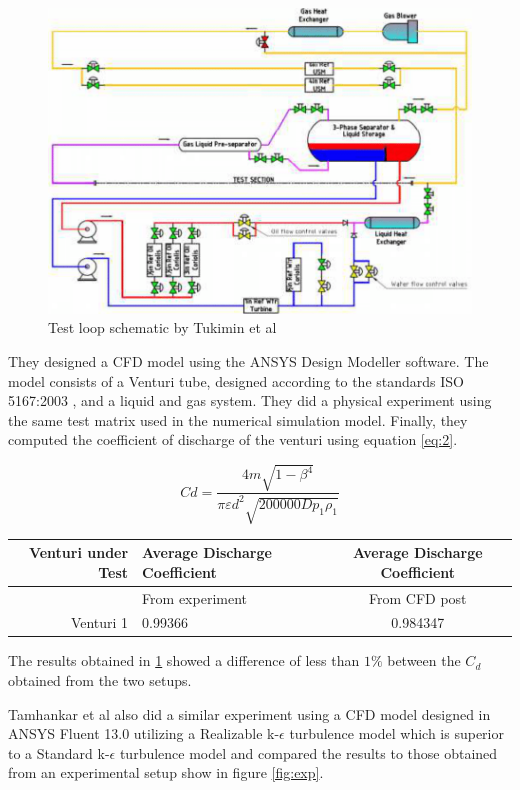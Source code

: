 \begin{figure}[ht]
\includegraphics[width=0.9\linewidth]{Figures/test_loop}
\centering
\caption[Test loop schematic]{ Test loop schematic by Tukimin et al \cite{tukimin2016cfd}}
\label{fig:test_loop_rig}
\end{figure}

They designed a CFD model using the ANSYS Design Modeller software. The model consists of a Venturi tube, designed according to the standards ISO 5167:2003 \cite{carello2013flow}, and a liquid and gas system. They did a physical experiment using the same test matrix used in the numerical simulation model. Finally, they computed the coefficient of discharge of the venturi using equation \ref{eq:2}.  

\begin{equation}
C d=\frac{4 m \sqrt{1-\beta^{4}}}{\pi \varepsilon d^{2} \sqrt{200000 D p_{1} \rho_{1}}}
\label{eq:2}
\end{equation}

\begin{table}[!t]
  \begin{center}
    \leavevmode
     \begin{tabular}{rlc}\hline
      Venturi under Test & Average Discharge Coefficient &  Average Discharge Coefficient \\ \hline
       & From experiment &  From CFD post \\ \hline
      Venturi 1 & 0.99366 &  0.984347 \\ \hline
    \end{tabular}
    \label{tab:cd}
  \end{center}
\end{table}
The results obtained in \ref{tab:cd} showed a difference of less than $1 \%$ between the $C_{d}$ obtained from the two setups.
\par
Tamhankar et al \cite{tamhankar2014experimental} also did a similar experiment using a CFD model designed in ANSYS Fluent 13.0 utilizing a Realizable k-$\epsilon$ turbulence model which is superior to a Standard k-$\epsilon$ turbulence model and compared the results to those obtained from an experimental setup show in figure \ref{fig:exp}. 


